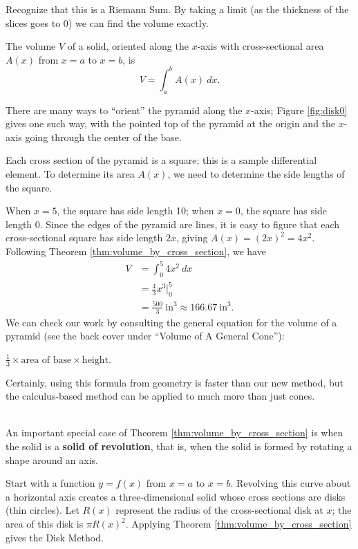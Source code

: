 Recognize that this is a Riemann Sum. By taking a limit (as the thickness of the slices goes to 0) we can find the volume exactly. 

{The volume $V$ of a solid, oriented along the $x$-axis with cross-sectional area $A(x)$ from $x=a$ to $x=b$, is
$$V = \int_a^b A(x)\ dx.$$
}

{There are many ways to ``orient'' the pyramid along the $x$-axis; Figure \ref{fig:disk0} gives one such way, with the pointed top of the pyramid at the origin and the $x$-axis going through the center of the base.

Each cross section of the pyramid is a square; this is a sample differential element. To determine its area $A(x)$, we need to determine the side lengths of the square.

When $x=5$, the square has side length 10; when $x=0$, the square has side length 0. Since the edges of the pyramid are lines, it is easy to figure that each cross-sectional square has side length $2x$, giving $A(x) = (2x)^2=4x^2$. Following Theorem \ref{thm:volume_by_cross_section}, we have 
\begin{align*} V &= \int_0^5 4x^2\ dx\\
				&= \frac43x^3\Big|_0^5 \\
				&=\frac{500}{3}\ \text{in}^3 \approx 166.67\ \text{in}^3.
\end{align*}
We can check our work by consulting the general equation for the volume of a pyramid (see the back cover under ``Volume of A General Cone''): 

\hfill $\frac13\times \text{area of base}\times \text{height}$.\hfill \null

\noindent Certainly, using this formula from geometry is faster than our new method, but the calculus-based method can be applied to much more than just cones.
}\\

An important special case of Theorem \ref{thm:volume_by_cross_section} is when the solid is a \textbf{solid of revolution}, that is, when the solid is formed by rotating a shape around an axis.

Start with a function $y=f(x)$ from $x=a$ to $x=b$. Revolving this curve about a horizontal axis creates a three-dimensional solid whose cross sections are disks (thin circles). Let $R(x)$ represent the radius of the cross-sectional disk at $x$; the area of this disk is $\pi R(x)^2$. Applying Theorem \ref{thm:volume_by_cross_section} gives the Disk Method.

